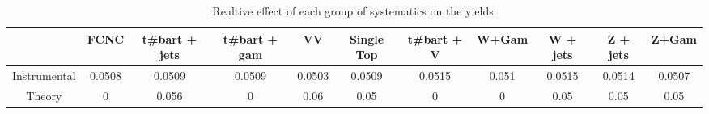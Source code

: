 \begin{table}[htbp]
\begin{center}
\begin{tabular}{|c|c|c|c|c|c|c|c|c|c|c|}
\hline 
      & FCNC      & t#bar{t} + jets      & t#bar{t} +  gam      & VV      & Single Top      & t#bar{t} + V      & W+Gam      & W + jets      & Z + jets      & Z+Gam \\ 
\hline 
 Instrumental & 0.0508 & 0.0509 & 0.0509 & 0.0503 & 0.0509 & 0.0515 & 0.051 & 0.0515 & 0.0514 & 0.0507 \\ 
 Theory & 0 & 0.056 & 0 & 0.06 & 0.05 & 0 & 0 & 0.05 & 0.05 & 0.05 \\ 
\hline 
\end{tabular} 
\caption{Realtive effect of each group of systematics on the yields.} 
\end{center} 
\end{table} 
